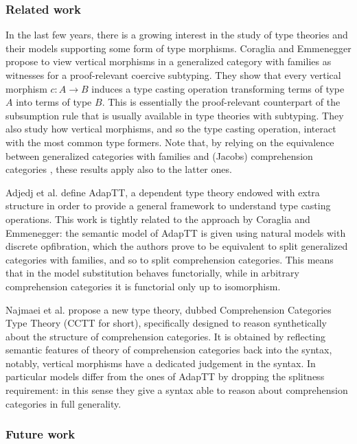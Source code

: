 \documentclass{lmcs} %
\theoremstyle{plain}\newtheorem{satz}[thm]{Satz} %
\begin{document}
\subsubsection*{Related work}
In the last few years, there is a growing interest in the study of type theories and their models supporting some form of type morphisms. 
% 
Coraglia and Emmenegger \cite{coraglia2023categorical} 
propose to view vertical morphisms in a generalized category with families as witnesses for a proof-relevant coercive subtyping. 
They show that every vertical morphism $c : A \to B$ induces a type casting operation transforming terms of type $A$ into terms of type $B$. 
This is essentially the proof-relevant counterpart of the subsumption rule that is usually available in type theories with subtyping. 
They also study how vertical morphisms, and so the type casting operation, interact with the most common type formers. 
Note that, by relying on the equivalence between generalized categories with families and (Jacobs) comprehension categories \cite{emmenegger}, 
these results apply also to the latter ones. 

Adjedj et al.  \cite{adjedj2026adaptt} define AdapTT, a dependent type theory endowed with extra structure in order to provide a general framework to understand type casting operations. 
This work is tightly related to the approach by Coraglia and Emmenegger: 
the semantic model of AdapTT is given using natural models with discrete opfibration, which the authors prove to be equivalent to split generalized categories with families, and so to split comprehension categories.
This means that in the model 
substitution behaves functorially, while in arbitrary comprehension categories it is functorial only up to isomorphism.

Najmaei et al. \cite{najmaei2026semantics} propose a new type theory, dubbed Comprehension Categories Type Theory (CCTT for short), specifically designed to reason synthetically about the structure of comprehension categories.
It is obtained by reflecting semantic features of theory of comprehension categories back into the syntax, notably, vertical morphisms have a dedicated judgement in the syntax. 
In particular models differ from the ones of AdapTT by dropping the splitness requirement: in this sense they give a syntax able to reason about comprehension categories in full generality.



\subsubsection*{Future work} 
\end{document}
